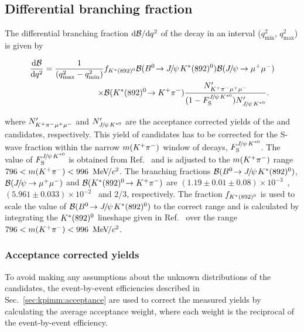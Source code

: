 \subsection{Differential branching fraction}
\label{sec:kpimm:bf}
 
The differential branching fraction $\mathrm{d}{\mathcal{B}}/\mathrm{d}{q^2}$ of the decay \BdToKpimm in an interval ($q^{2}_{\text{min}}$, $q^{2}_{\text{max}}$) is given by

\begin{equation}
\begin{split}
\frac{\deriv\BF}{\deriv\qsq} = \frac{1}{(q^{2}_{\text{max}} - q^{2}_{\text{min}}) }&f_{\KstP}\BF(\BdToJPsiKstP)\BF(\decay{\jpsi}{\mumu}) \\
\times&\BF(\decay{\KstP}{\Kp\pim})\frac{N'_{\kpimm}}{(1-F_{\rm S}^{\jpsi\Kstarz})N'_{\jpsi\Kstarz}}.
\end{split}
\label{eqn:dbfdq2}
\end{equation}
 
\noindent where $N'_{{{K}^+}{{\pi}^-}{\mu^+}{\mu^-}}$ and $N'_{{{J\mskip -3mu/\mskip -2mu\psi\mskip 2mu}}{{K}^{*0}}}$ are the acceptance corrected yields of the \BdToKpimm and \BdToJPsiKst candidates, respectively. This yield of \BdToJPsiKst candidates has to be corrected for the S-wave fraction within the narrow $m({{K}^+}{{\pi}^-})$ window of \BdToJPsiKst decays, $F_{\rm S}^{{{J\mskip -3mu/\mskip -2mu\psi\mskip 2mu}}{{K}^{*0}}}$. The value of $F_{\rm S}^{{{J\mskip -3mu/\mskip -2mu\psi\mskip 2mu}}{{K}^{*0}}}$ is obtained from Ref.~\cite{LHCb-PAPER-2013-023} and is adjusted to the $m({{K}^+}{{\pi}^-})$ range $796<m({{K}^+}{{\pi}^-})<996~{\mathrm{\,Me\kern -0.1em V\!/}c^2}$. The branching fractions ${\mathcal{B}}({{B}^0}\!\rightarrow {\ensuremath{{J\mskip -3mu/\mskip -2mu\psi\mskip 2mu}}}{\ensuremath{K}}^{*}(892)^{0})$, ${\mathcal{B}}({{J\mskip -3mu/\mskip -2mu\psi\mskip 2mu}}\!\rightarrow {\ensuremath{\mu^+\mu^-}})$ and ${\mathcal{B}}({K}^{*}(892)^{0}\!\rightarrow {\ensuremath{{K}^+}}{\ensuremath{{\pi}^-}})$ are $(1.19\pm0.01\pm0.08)\times10^{-3}$~\cite{belle-z-paper}, $(5.961 \pm 0.033) \times 10^{-2}$~\cite{pdg} and 2/3, respectively. The fraction $f_{{K}^{*}(892)^{0}}$ is used to scale the value of ${\mathcal{B}}({{B}^0}\!\rightarrow {\ensuremath{{J\mskip -3mu/\mskip -2mu\psi\mskip 2mu}}}{\ensuremath{K}}^{*}(892)^{0})$ to the correct \mkpi range and is calculated by integrating the ${K}^{*}(892)^{0}$ lineshape given in Ref.~\cite{belle-z-paper} over the range $796<m({{K}^+}{{\pi}^-})<996~{\mathrm{\,Me\kern -0.1em V\!/}c^2}$.
 
\subsubsection{Acceptance corrected yields}
 
To avoid making any assumptions about the unknown distributions of the \BdToKpimm candidates, the event-by-event efficiencies described in Sec.~\ref{sec:kpimm:acceptance} are used to correct the measured yields by calculating the average acceptance weight, where each weight is the reciprocal of the event-by-event efficiency.
 
